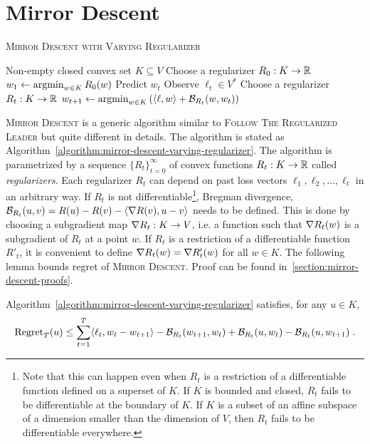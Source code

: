 \section{Mirror Descent}
\label{section:mirror-descent}

\begin{algorithm}[t]
\caption{\textsc{Mirror Descent with Varying Regularizer}}
\label{algorithm:mirror-descent-varying-regularizer}
\begin{algorithmic}[1]
\REQUIRE Non-empty closed convex set $K \subseteq V$
\STATE Choose a regularizer $R_0:K \to \mathbb{R}$
\STATE $w_1 \leftarrow \operatorname*{argmin}_{w \in K} R_0(w)$
\STATE Predict $w_t$
\STATE Observe $\ell_t \in V^*$
\STATE Choose a regularizer $R_t:K \to \mathbb{R}$
\STATE $w_{t+1} \leftarrow \operatorname*{argmin}_{w \in K} \left( \langle \ell, w \rangle + \mathcal{B}_{R_t}(w, w_t) \right)$
\ENDFOR
\end{algorithmic}
\end{algorithm}


\textsc{Mirror Descent} is a generic algorithm similar to \textsc{Follow The
Regularized Leader} but quite different in details. The algorithm is stated as
Algorithm~\ref{algorithm:mirror-descent-varying-regularizer}. The algorithm is
parametrized by a sequence $\{R_t\}_{t=0}^\infty$ of convex functions $R_t:K
\to \mathbb{R}$ called \emph{regularizers}. Each regularizer $R_t$ can depend on past
loss vectors $\ell_1, \ell_2, \dots, \ell_t$ in an arbitrary way. If $R_t$ is
not differentiable\footnote{Note that this can happen even when $R_t$ is a
restriction of a differentiable function defined on a superset of $K$.  If $K$
is bounded and closed, $R_t$ fails to be differentiable at the boundary of $K$.
If $K$ is a subset of an affine subspace of a dimension smaller than the
dimension of $V$, then $R_t$ fails to be differentiable everywhere.}, Bregman
divergence, $\mathcal{B}_{R_t}(u,v) = R(u) - R(v) - \langle \nabla R(v), u - v
\rangle$ needs to be defined. This is done by choosing a subgradient map $\nabla
R_t:K \to V$, i.e. a function such that $\nabla R_t(w)$ is a subgradient of
$R_t$ at a point $w$. If $R_t$ is a restriction of a differentiable function
$R'_t$, it is convenient to define $\nabla R_t(w) = \nabla R'_t(w)$ for all $w
\in K$. The following lemma bounds regret of \textsc{Mirror Descent}.  Proof
can be found in~\ref{section:mirror-descent-proofs}.

\begin{lemma}
\label{lemma:mirror-descent-regret}
Algorithm~\ref{algorithm:mirror-descent-varying-regularizer} satisfies, for any
$u \in K$,
$$
\operatorname{Regret}_T(u)
\le
\sum_{t=1}^T \langle \ell_t, w_t - w_{t+1} \rangle - \mathcal{B}_{R_t}(w_{t+1}, w_t) + \mathcal{B}_{R_t}(u,w_t) - \mathcal{B}_{R_t}(u, w_{t+1}) \; .
$$
\end{lemma}

